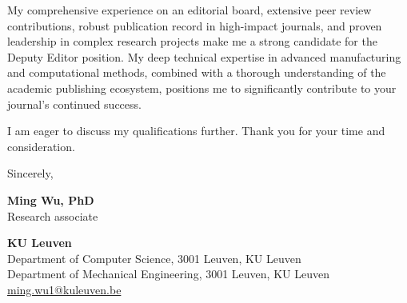 \documentclass[a4paper,9pt]{article}
\begin{document}
My comprehensive experience on an editorial board, extensive peer review contributions, robust publication record in high-impact journals, and proven leadership in complex research projects make me a strong candidate for the Deputy Editor position. My deep technical expertise in advanced manufacturing and computational methods, combined with a thorough understanding of the academic publishing ecosystem, positions me to significantly contribute to your journal's continued success.

I am eager to discuss my qualifications further. Thank you for your time and consideration.


\vspace{0.5cm}
Sincerely,

\vspace{0cm}
\textcolor{KULBlue_D}{\textbf{Ming Wu, PhD}}\\
\textcolor{KULBlue_C}{Research associate}

\vspace{0cm}
\color{KULBlue_D}
\textbf{KU Leuven}\\
\color{KULBlue_C}
Department of Computer Science, 3001 Leuven, KU Leuven\\
Department of Mechanical Engineering, 3001 Leuven, KU Leuven\\
\underline{\textcolor{KULBlue_D}{ming.wu1@kuleuven.be}}
\color{black}
% 
% 
\end{document}
